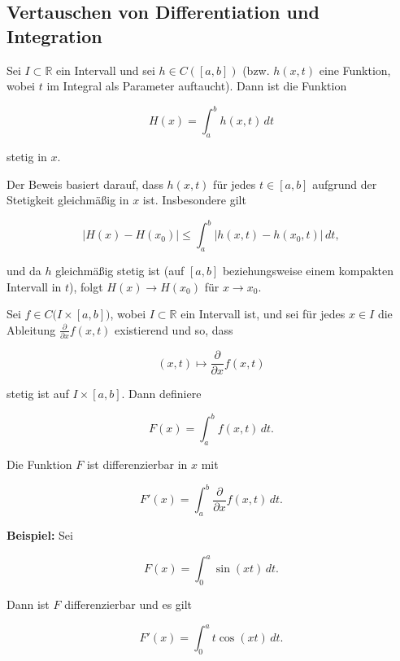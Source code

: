 \subsection{Vertauschen von Differentiation und Integration}


\begin{lemma}{}
Sei $I\subset \mathbb{R}$ ein Intervall und sei $h\in C([a,b])$ (bzw. $h(x,t)$ eine Funktion, wobei $t$ im Integral als Parameter auftaucht). Dann ist die Funktion


$$
H(x)=\int_a^b h(x,t)\,dt
$$


stetig in $x$. 
\end{lemma}

\begin{beweisbox}
Der Beweis basiert darauf, dass $h(x,t)$ für jedes $t\in [a,b]$ aufgrund der Stetigkeit gleichmäßig in $x$ ist. Insbesondere gilt


$$
|H(x)-H(x_0)|\le \int_a^b |h(x,t)-h(x_0,t)|\,dt,
$$


und da $h$ gleichmäßig stetig ist (auf $ [a,b]$ beziehungsweise einem kompakten Intervall in $t$), folgt $H(x)\to H(x_0)$ für $x\to x_0$. 
\end{beweisbox}

\begin{satz}{}
Sei $f\in C\bigl(I\times [a,b]\bigr)$, wobei $I\subset\mathbb{R}$ ein Intervall ist, und sei für jedes $x\in I$ die Ableitung $\frac{\partial}{\partial x}f(x,t)$ existierend und so, dass


$$
(x,t)\mapsto \frac{\partial}{\partial x}f(x,t)
$$


stetig ist auf $I\times [a,b]$. Dann definiere


$$
F(x)=\int_a^b f(x,t)\,dt.
$$


Die Funktion $F$ ist differenzierbar in $x$ mit


$$
F'(x)=\int_a^b \frac{\partial}{\partial x}f(x,t)\,dt.
$$


\end{satz}


\begin{beispielbox}
\textbf{Beispiel:} Sei


$$
F(x)=\int_0^a \sin(xt)\,dt.
$$


Dann ist $F$ differenzierbar und es gilt


$$
F'(x)=\int_0^a t\cos(xt)\,dt.
$$


\end{beispielbox}

